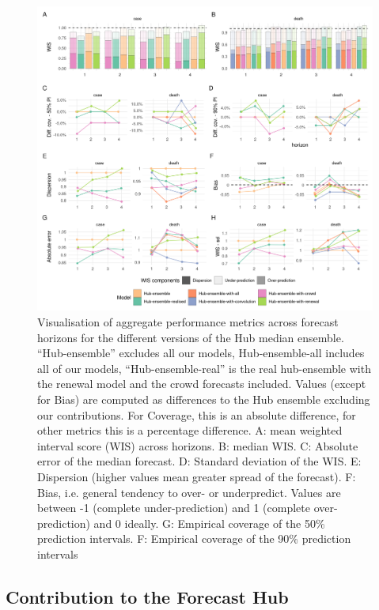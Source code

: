 \documentclass[
]{article}
\begin{document}
\begin{figure}[H]
\includegraphics[width=1\linewidth,]{../analysis/plots/aggregate-performance-rel-ensemble-v4} \caption{Visualisation of aggregate performance metrics across forecast horizons for the different versions of the Hub median ensemble. “Hub-ensemble” excludes all our models, Hub-ensemble-all includes all of our models, “Hub-ensemble-real” is the real hub-ensemble with the renewal model and the crowd forecasts included. Values (except for Bias) are computed as differences to the Hub ensemble excluding our contributions. For Coverage, this is an absolute difference, for other metrics this is a percentage difference. A: mean weighted interval score (WIS) across horizons. B: median WIS. C: Absolute error of the median forecast. D: Standard deviation of the WIS. E: Dispersion (higher values mean greater spread of the forecast). F: Bias, i.e. general tendency to over- or underpredict. Values are between -1 (complete under-prediction) and 1 (complete over-prediction) and 0 ideally. G: Empirical coverage of the 50\% prediction intervals. F: Empirical coverage of the 90\% prediction intervals}\label{fig:agg-performance-ensemble}
\end{figure}

\hypertarget{contribution-to-the-forecast-hub}{%
\subsection{Contribution to the Forecast Hub}\label{contribution-to-the-forecast-hub}}
\end{document}
